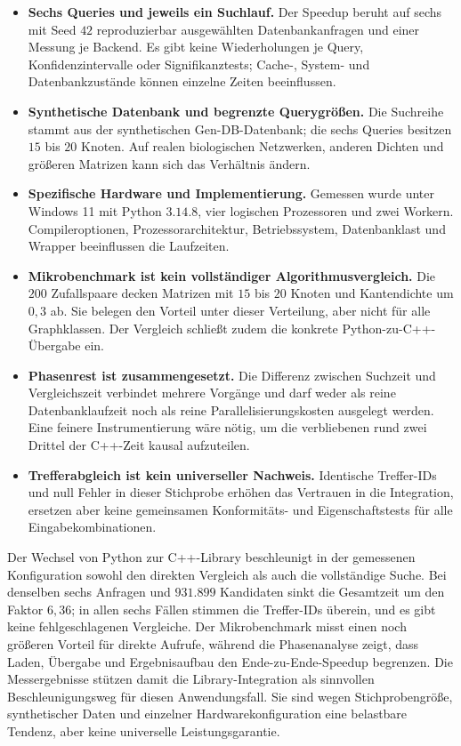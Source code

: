 \documentclass[a4paper,12pt, twoside]{report}
\theoremstyle{definition}
\begin{document}
\begin{itemize}
	\item \textbf{Sechs Queries und jeweils ein Suchlauf.} Der Speedup beruht auf sechs mit Seed $42$ reproduzierbar ausgewählten Datenbankanfragen und einer Messung je Backend. Es gibt keine Wiederholungen je Query, Konfidenzintervalle oder Signifikanztests; Cache-, System- und Datenbankzustände können einzelne Zeiten beeinflussen.
	\item \textbf{Synthetische Datenbank und begrenzte Querygrößen.} Die Suchreihe stammt aus der synthetischen Gen-DB-Datenbank; die sechs Queries besitzen $15$ bis $20$ Knoten. Auf realen biologischen Netzwerken, anderen Dichten und größeren Matrizen kann sich das Verhältnis ändern.
	\item \textbf{Spezifische Hardware und Implementierung.} Gemessen wurde unter Windows 11 mit Python $3.14.8$, vier logischen Prozessoren und zwei Workern. Compileroptionen, Prozessorarchitektur, Betriebssystem, Datenbanklast und Wrapper beeinflussen die Laufzeiten.
	\item \textbf{Mikrobenchmark ist kein vollständiger Algorithmusvergleich.} Die $200$ Zufallspaare decken Matrizen mit $15$ bis $20$ Knoten und Kantendichte um $0{,}3$ ab. Sie belegen den Vorteil unter dieser Verteilung, aber nicht für alle Graphklassen. Der Vergleich schließt zudem die konkrete Python-zu-C++-Übergabe ein.
	\item \textbf{Phasenrest ist zusammengesetzt.} Die Differenz zwischen Suchzeit und Vergleichszeit verbindet mehrere Vorgänge und darf weder als reine Datenbanklaufzeit noch als reine Parallelisierungskosten ausgelegt werden. Eine feinere Instrumentierung wäre nötig, um die verbliebenen rund zwei Drittel der C++-Zeit kausal aufzuteilen.
	\item \textbf{Trefferabgleich ist kein universeller Nachweis.} Identische Treffer-IDs und null Fehler in dieser Stichprobe erhöhen das Vertrauen in die Integration, ersetzen aber keine gemeinsamen Konformitäts- und Eigenschaftstests für alle Eingabekombinationen.
\end{itemize}

Der Wechsel von Python zur C++-Library beschleunigt in der gemessenen Konfiguration sowohl den direkten Vergleich als auch die vollständige Suche. Bei denselben sechs Anfragen und $931.899$ Kandidaten sinkt die Gesamtzeit um den Faktor $6{,}36$; in allen sechs Fällen stimmen die Treffer-IDs überein, und es gibt keine fehlgeschlagenen Vergleiche. Der Mikrobenchmark misst einen noch größeren Vorteil für direkte Aufrufe, während die Phasenanalyse zeigt, dass Laden, Übergabe und Ergebnisaufbau den Ende-zu-Ende-Speedup begrenzen. Die Messergebnisse stützen damit die Library-Integration als sinnvollen Beschleunigungsweg für diesen Anwendungsfall. Sie sind wegen Stichprobengröße, synthetischer Daten und einzelner Hardwarekonfiguration eine belastbare Tendenz, aber keine universelle Leistungsgarantie.
\end{document}
